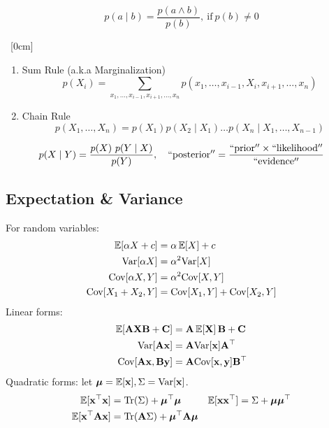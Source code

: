 \begin{definition}
	\begin{equation}
p(a \mid b)=\frac{p(a \wedge b)}{p(b)}, \ \mathrm{if}\ p(b) \neq 0
\end{equation}
\end{definition}
\begin{property}
\ [0cm]
\begin{enumerate}
	\item Sum Rule (a.k.a Marginalization) \begin{equation}
p\left(X_{i}\right)=\sum_{x_{1}, \ldots, x_{i-1}, x_{i+1}, \ldots, x_{n}} p\left(x_{1}, \ldots, x_{i-1}, X_{i}, x_{i+1}, \ldots, x_{n}\right)
\end{equation}
	\item Chain Rule \begin{equation}
p\left(X_{1}, \ldots, X_{n}\right)=p\left(X_{1}\right) p\left(X_{2} \mid X_{1}\right) \ldots p\left(X_{n} \mid X_{1}, \ldots, X_{n-1}\right)
\end{equation}
\end{enumerate}
\end{property}

\begin{definition}
\begin{equation}
		p(X \mid Y)=\frac{p(X)\ p(Y \mid X)}{p(Y)}, \quad 
		\mathrm{`` posterior''}=\frac{\mathrm{`` prior''} \times \mathrm{``likelihood''}}{\mathrm{`` evidence''}}
\end{equation}
\end{definition}

\subsection{Expectation \& Variance}
For random variables:
\begin{align}
	\mathbb{E}[\alpha X + c] & = \alpha\, \mathbb{E}[ X ] + c \\
	\mathrm{Var}[\alpha X] & = \alpha^2 \mathrm{Var}[X]\\
	\mathrm{Cov}[\alpha X, Y] & = \alpha^2 \mathrm{Cov}[X, Y]\\
	\mathrm{Cov}[X_1 + X_2, Y] & = \mathrm{Cov}[X_1, Y] + \mathrm{Cov}[X_2, Y]
\end{align}
Linear forms:
\begin{align}
	\mathbb{E}[\mathbf{A} \mathbf{X} \mathbf{B} + \mathbf{C}] & = \mathbf{A}\, \mathbb{E}[ \mathbf{X} ]\, \mathbf{B} + \mathbf{C} \\
	\mathrm{Var}[\mathbf{A} \mathbf{x}] & = \mathbf{A} \mathrm{Var}[\mathbf{x}] \mathbf{A}^\top \\
	\mathrm{Cov}[\mathbf{A} \mathbf{x}, \mathbf{B} \mathbf{y}] & = \mathbf{A} \mathrm{Cov}[\mathbf{x}, \mathbf{y}] \mathbf{B}^\top
\end{align}
Quadratic forms: let $\boldsymbol{\mu} = \mathbb{E}[\mathbf{x}], \Sigma = \mathrm{Var}[\mathbf{x}]$.
\begin{align}
	\mathbb{E}[\mathbf{x}^\top \mathbf{x}] & = \mathrm{Tr}(\Sigma) + \boldsymbol{\mu}^\top \boldsymbol{\mu} & \mathbb{E}[\mathbf{x} \mathbf{x}^\top] & = \Sigma + \boldsymbol{\mu} \boldsymbol{\mu}^\top  \\
	\mathbb{E}[\mathbf{x}^\top \mathbf{A} \mathbf{x}] & = \mathrm{Tr}(\mathbf{A} \Sigma) + \boldsymbol{\mu}^\top \mathbf{A} \boldsymbol{\mu}
\end{align}

